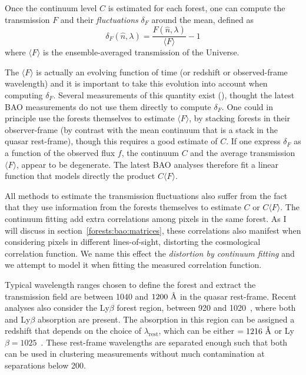Once the continuum level $C$ is estimated for each forest, one can compute 
the transmission $F$ and their \emph{fluctuations} $\delta_F$ around the mean,
defined as 
\begin{equation}
\delta_F(\hat{n}, \lambda) = \frac{F(\hat{n}, \lambda)}{\langle F \rangle} - 1
\label{eq:delta_transmission}
\end{equation}
where $\langle F \rangle$ is the ensemble-averaged transmission of the Universe. 

The $\langle F \rangle$ is actually an evolving function of time (or redshift or observed-frame 
wavelength) and it is important to take this evolution into account when computing 
$\delta_F$. 
Several measurements of this quantity exist 
(\cite{faucher-giguereDirectPrecisionMeasurement2008,
parisPrincipalComponentAnalysis2011,
beckerRefinedMeasurementMean2013,
kambleMeasurementsEffectiveOptical2020}), thought the latest BAO measurements do not 
use them directly to compute $\delta_F$. One could in principle use the forests themselves
to estimate $\langle F \rangle$, by stacking forests in their observer-frame 
(by contrast with the mean continuum that is a stack in the quasar rest-frame), 
though this requires a good estimate of $C$. 
If one express $\delta_F$ as a function of 
the observed flux $f$, the continuum $C$ and the average transmission $\langle F \rangle$,
appear to be degenerate. 
The latest BAO analyses therefore fit a linear function 
that models directly the product $C \langle F \rangle$. 

All methods to estimate the transmission fluctuations also suffer from the fact 
that they use information from the forests themselves to estimate $C$ or $C \langle F \rangle$.
The continuum fitting add extra correlations among pixels in the same forest. 
As I will discuss in section~\ref{forests:bao:matrices},
these correlations also manifest when considering pixels in different lines-of-sight, 
distorting the cosmological correlation function. 
We name this effect the \emph{distortion by continuum fitting} 
and we attempt to model it when fitting the measured correlation function.

Typical wavelength ranges chosen to define the \lya forest and extract the transmission field
are between 1040 and $1200~\angstrom$ in the quasar rest-frame. 
Recent analyses also consider the Ly$\beta$ forest region, between 920 and 1020~\angstrom, 
where both \lya and Ly$\beta$ absorption are present. The absorption in this region 
can be assigned a redshift that depends on the choice of $\lambda_\mathrm{rest}$, 
which can be either \lya$ = 1216~\angstrom$  or Ly$\beta = 1025$~\angstrom. 
These rest-frame wavelengths are separated enough such that both can be used 
in clustering measurements without much contamination at separations below 200\hmpc.

